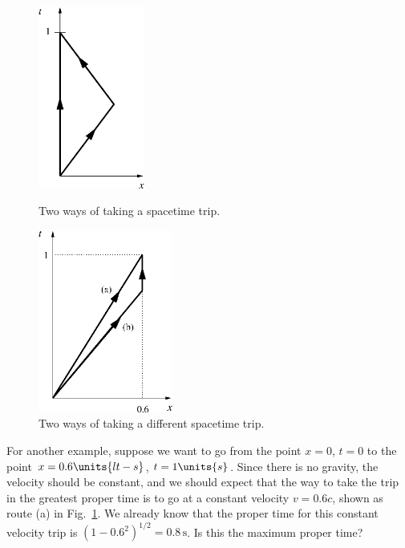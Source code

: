 \begin{figure}[h]  
\begin{minipage}[t]{5.0cm}
\begin{center}
\includegraphics[height=6cm]{gravity_and_geometry/trip.eps}
\caption{Two ways of taking a spacetime trip.}
\label{fig:trip}
\end{center}   
\end{minipage}
\hfill
\begin{minipage}[t]{6.3cm}
\begin{center}
\includegraphics[height=6cm]{gravity_and_geometry/trip2.eps}
\caption{Two ways of taking a different spacetime trip.}
\label{fig:trip2}
\end{center}
\end{minipage}
\end{figure}

For another example, suppose we want to go from the point $x = 0$, $t
= 0$ to the point $x = 0.6\units{lt-s}$, $t = 1\units{s}$.  Since
there is no gravity, the velocity should be constant, and we should
expect that the way to take the trip in the greatest proper time is to
go at a constant velocity $v = 0.6 c$, shown as route (a) in
Fig.~\ref{fig:trip2}.  We already know that the proper time for this
constant velocity trip is $(1 -0.6^2)^{1/2} = 0.8\, \mbox{s}$.  Is this
the maximum proper time?
        
